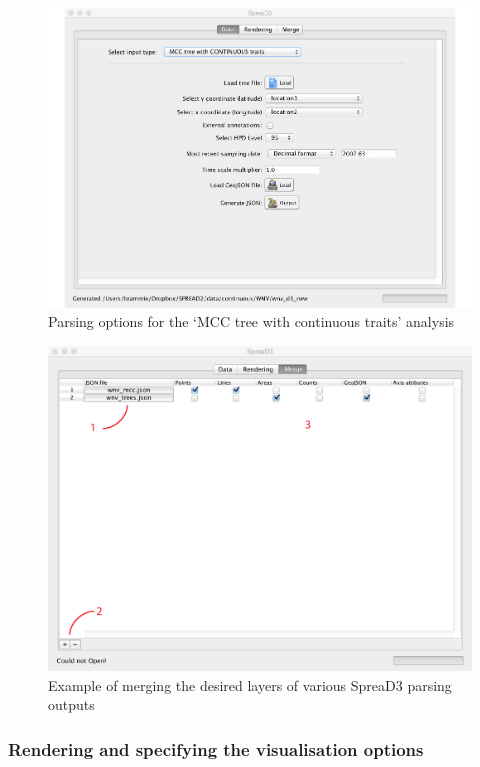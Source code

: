 \documentclass[english]{paper}
\def \spreadname {SpreaD3}
\begin{document}
\begin{figure}%
\centering
\includegraphics[width=1\textwidth]{./figures/new_parseMCCposterior.pdf} 
\caption{Parsing options for the `MCC tree with continuous traits' analysis}
\label{fig:parsePosteriorMCC}
\end{figure}

\begin{figure}%
\centering
\includegraphics[width=1\textwidth]{./figures/new_merge_wnv.pdf} 
\caption{Example of merging the desired layers of various {\spreadname} parsing outputs}
\label{fig:mergeTimeSlice}
\end{figure}


\subsubsection{Rendering and specifying the visualisation options}
\end{document}
